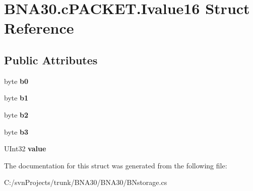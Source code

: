 \hypertarget{struct_b_n_a30_1_1c_p_a_c_k_e_t_1_1_ivalue16}{}\section{B\+N\+A30.\+c\+P\+A\+C\+K\+E\+T.\+Ivalue16 Struct Reference}
\label{struct_b_n_a30_1_1c_p_a_c_k_e_t_1_1_ivalue16}
\subsection*{Public Attributes}
\begin{DoxyCompactItemize}
\item 
\mbox{\label{struct_b_n_a30_1_1c_p_a_c_k_e_t_1_1_ivalue16_a8fade046d231cb7626bd40f74c908623}} 
byte {\bfseries b0}
\item 
\mbox{\label{struct_b_n_a30_1_1c_p_a_c_k_e_t_1_1_ivalue16_abacd870b40704ff630200404b261a0ec}} 
byte {\bfseries b1}
\item 
\mbox{\label{struct_b_n_a30_1_1c_p_a_c_k_e_t_1_1_ivalue16_ad93a7b928915b9f4cedc4c8e53e9fdc3}} 
byte {\bfseries b2}
\item 
\mbox{\label{struct_b_n_a30_1_1c_p_a_c_k_e_t_1_1_ivalue16_ae487107c4f97f42b1448af6b3563bb39}} 
byte {\bfseries b3}
\item 
\mbox{\label{struct_b_n_a30_1_1c_p_a_c_k_e_t_1_1_ivalue16_aeb306bf399d2f4be36f48d42062497b5}} 
U\+Int32 {\bfseries value}
\end{DoxyCompactItemize}


The documentation for this struct was generated from the following file\+:\begin{DoxyCompactItemize}
\item 
C\+:/svn\+Projects/trunk/\+B\+N\+A30/\+B\+N\+A30/B\+Nstorage.\+cs\end{DoxyCompactItemize}

